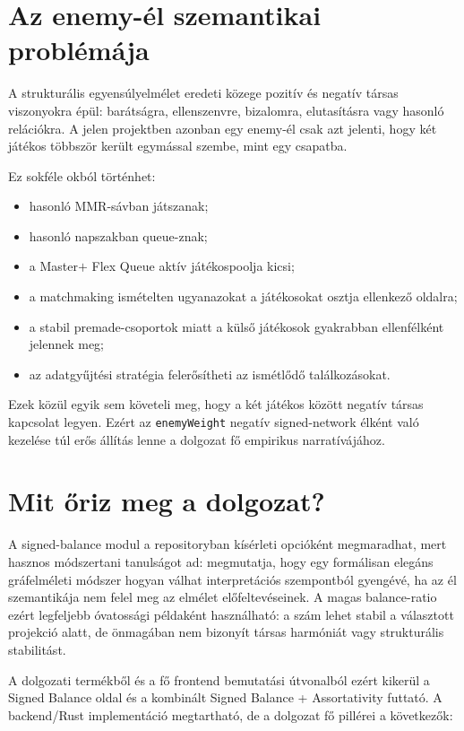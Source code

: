 ﻿\documentclass[a4paper,12pt]{report}
\begin{document}
\section{Az enemy-él szemantikai problémája}

A strukturális egyensúlyelmélet eredeti közege pozitív és negatív társas viszonyokra épül: barátságra, ellenszenvre, bizalomra, elutasításra vagy hasonló relációkra. A jelen projektben azonban egy enemy-él csak azt jelenti, hogy két játékos többször került egymással szembe, mint egy csapatba.

Ez sokféle okból történhet:

\begin{itemize}
    \item hasonló MMR-sávban játszanak;
    \item hasonló napszakban queue-znak;
    \item a Master$+$ Flex Queue aktív játékospoolja kicsi;
    \item a matchmaking ismételten ugyanazokat a játékosokat osztja ellenkező oldalra;
    \item a stabil premade-csoportok miatt a külső játékosok gyakrabban ellenfélként jelennek meg;
    \item az adatgyűjtési stratégia felerősítheti az ismétlődő találkozásokat.
\end{itemize}

Ezek közül egyik sem követeli meg, hogy a két játékos között negatív társas kapcsolat legyen. Ezért az \texttt{enemyWeight} negatív signed-network élként való kezelése túl erős állítás lenne a dolgozat fő empirikus narratívájához.

\section{Mit őriz meg a dolgozat?}

A signed-balance modul a repositoryban kísérleti opcióként megmaradhat, mert hasznos módszertani tanulságot ad: megmutatja, hogy egy formálisan elegáns gráfelméleti módszer hogyan válhat interpretációs szempontból gyengévé, ha az él szemantikája nem felel meg az elmélet előfeltevéseinek. A magas balance-ratio ezért legfeljebb óvatossági példaként használható: a szám lehet stabil a választott projekció alatt, de önmagában nem bizonyít társas harmóniát vagy strukturális stabilitást.

A dolgozati termékből és a fő frontend bemutatási útvonalból ezért kikerül a Signed Balance oldal és a kombinált Signed Balance + Assortativity futtató. A backend/Rust implementáció megtartható, de a dolgozat fő pillérei a következők:
\end{document}
